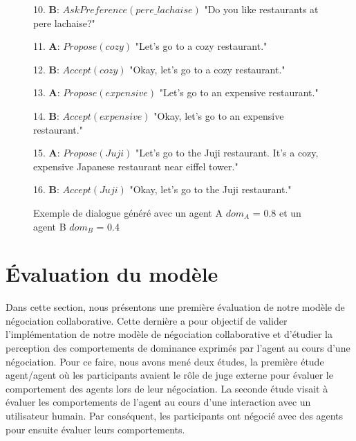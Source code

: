 \begin{figure}[!t]
\begin{minipage}{\textwidth}
{\begin{addmargin}[1em]{2em}
					
					10. \hspace*{3mm}\textbf{B}: $AskPreference(pere\_lachaise)$ "Do you like \hspace*{4mm} restaurants at pere lachaise?"
					
					
					11. \textbf{A}: $Propose(cozy)$ "Let's go to a cozy restaurant."
					
					
					12. \hspace*{3mm}\textbf{B}: $Accept(cozy)$ "Okay, let's go to a cozy  \hspace*{4mm} restaurant."
					
					
					13. \textbf{A}: $Propose(expensive)$ "Let's go to an expensive \hspace*{3mm} restaurant."
					
					
					14. \hspace*{3mm}\textbf{B}: $Accept(expensive)$ "Okay, let's go to\hspace*{4mm} an expensive restaurant."
					
					
					15. \textbf{A}: $Propose(Juji)$ "Let's go to the Juji restaurant. \hspace*{3mm} It's a cozy, expensive Japanese restaurant \hspace*{3mm} near eiffel tower."
					
					
					16. \hspace*{3mm}\textbf{B}: $Accept(Juji)$ "Okay, let's go to the Juji \hspace*{4mm} restaurant."
					\vspace{0.5 em}
				\end{addmargin}
			}
	\end{minipage}
			\caption{\label{fig: ex-dialogue} Exemple de dialogue généré avec un agent A $dom_A$ = 0.8 et un agent B $dom_B$ = 0.4}
\end{figure}
	
	\section{Évaluation du modèle}
		
		Dans cette section, nous présentons une première évaluation de notre modèle de négociation collaborative. Cette dernière a pour objectif de valider l'implémentation de notre modèle de négociation collaborative et d'étudier la perception des comportements de dominance exprimés par l'agent au cours d'une négociation. 
		Pour ce faire, nous avons mené deux études, la première étude agent/agent où les participants avaient le rôle de juge externe pour évaluer le comportement des agents lors de leur négociation.
		La seconde étude visait à évaluer les comportements de l'agent au cours d'une interaction avec un utilisateur humain. Par conséquent, les participants ont négocié avec des agents pour ensuite évaluer leurs comportements. 
		
